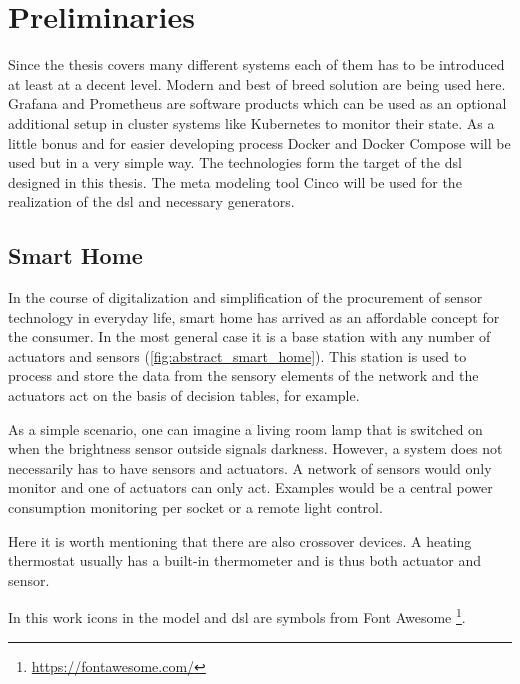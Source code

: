 \chapter{Preliminaries}
\label{chapter:grundlagen}

Since the thesis covers many different systems each of them has to be introduced at least at a decent level. Modern and best of breed solution are being used here. Grafana and Prometheus are software products which can be used as an optional additional setup in cluster systems like Kubernetes to monitor their state. As a little bonus and for easier developing process Docker and Docker Compose will be used but in a very simple way. The technologies form the target of the \gls{dsl} designed in this thesis. The meta modeling tool Cinco will be used for the realization of the \gls{dsl} and necessary generators.
 
\section{Smart Home}

In the course of digitalization and simplification of the procurement of sensor technology in everyday life, smart home has arrived as an affordable concept for the consumer. In the most general case it is a base station with any number of actuators and sensors (\cref{fig:abstract_smart_home}). This station is used to process and store the data from the sensory elements of the network and the actuators act on the basis of decision tables, for example. 

As a simple scenario, one can imagine a living room lamp that is switched on when the brightness sensor outside signals darkness. However, a system does not necessarily has to have sensors and actuators. A network of sensors would only monitor and one of actuators can only act. Examples would be a central power consumption monitoring per socket or a remote light control.

Here it is worth mentioning that there are also crossover devices. A heating thermostat usually has a built-in thermometer and is thus both actuator and sensor.

In this work icons in the model and \gls{dsl} are symbols from Font Awesome \footnote{\url{https://fontawesome.com/}}.

